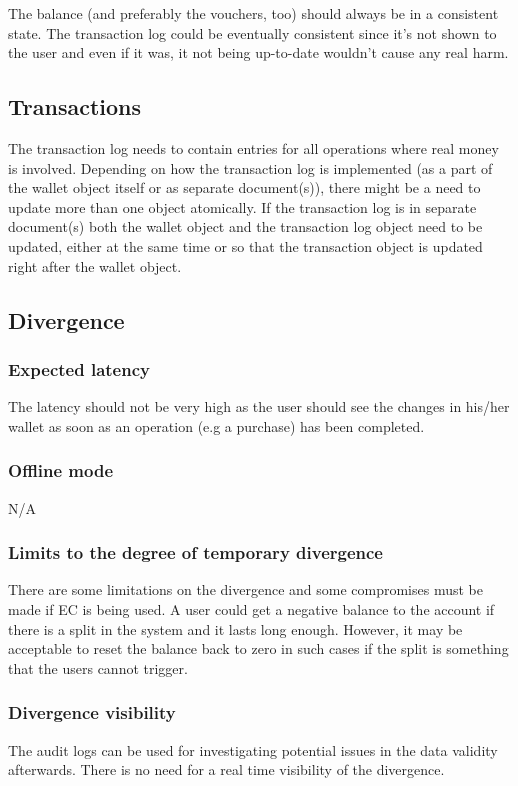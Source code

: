 \documentclass[11pt,a4paper]{report}
\begin{document}
The balance (and preferably the vouchers, too) should always be in a consistent state. 
The transaction log could be eventually consistent since it's not shown to the user and even if it was, it not being up­-to-­date wouldn't cause any real harm.

\subsection{Transactions}
The transaction log needs to contain entries for all operations where real money is involved. Depending on how the transaction log is implemented (as a part of the wallet object itself or as separate document(s)), there might be a need to update more than one object atomically. If the transaction log is in separate document(s) both the wallet object and the transaction log object need to be updated, either at the same time or so that the transaction object is updated right after the wallet object.

\subsection{Divergence}
\subsubsection{Expected latency}
The latency should not be very high as the user should see the changes in his/her wallet as soon as an operation (e.g a purchase) has been completed.

\subsubsection{Offline mode}
N/A

\subsubsection{Limits to the degree of temporary divergence}
There are some limitations on the divergence and some compromises must be made if EC is being used. A user could get a negative balance to the account if there is a split in the system and it lasts long enough. However, it may be acceptable to reset the balance back to zero in such cases if the split is something that the users cannot trigger.

\subsubsection{Divergence visibility}
The audit logs can be used for investigating potential issues in the data validity afterwards. There is no need for a real time visibility of the divergence.
\end{document}
